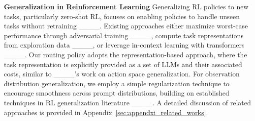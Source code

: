\textbf{Generalization in Reinforcement Learning}\quad
Generalizing RL policies to new tasks, particularly zero-shot RL, focuses on enabling policies to handle unseen tasks without retraining ____. Existing approaches either maximize worst-case performance through adversarial training ____, compute task representations from exploration data ____, or leverage in-context learning with transformers ____. Our routing policy adopts the representation-based approach, where the task representation is explicitly provided as a set of LLMs and their associated costs, similar to ____'s work on action space generalization. For observation distribution generalization, we employ a simple regularization technique to encourage smoothness across prompt distributions, building on established techniques in RL generalization literature ____. A detailed discussion of related approaches is provided in Appendix~\ref{sec:appendxi_related_works}.

\vspace{-4pt}